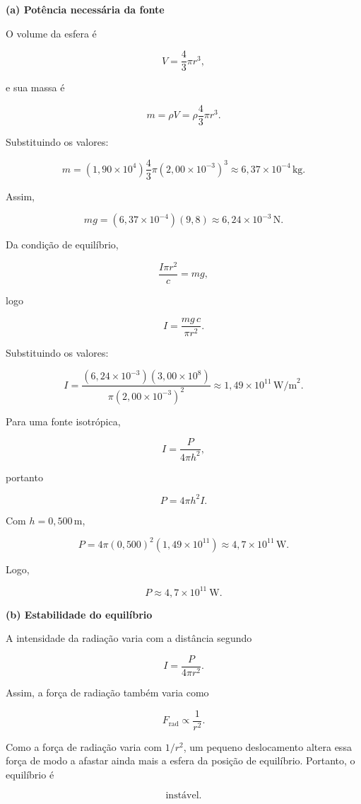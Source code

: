 \textbf{(a) Potência necessária da fonte}

O volume da esfera é

\[
V=\frac{4}{3}\pi r^3,
\]

e sua massa é

\[
m=\rho V
  =\rho\frac{4}{3}\pi r^3.
\]

Substituindo os valores:

\[
m
=(1,90\times10^{4})
\frac{4}{3}\pi(2,00\times10^{-3})^3
\approx 6,37\times10^{-4}\,\text{kg}.
\]

Assim,

\[
mg
=(6,37\times10^{-4})(9,8)
\approx 6,24\times10^{-3}\,\text{N}.
\]

Da condição de equilíbrio,

\[
\frac{I\pi r^2}{c}=mg,
\]

logo

\[
I=\frac{mg\,c}{\pi r^2}.
\]

Substituindo os valores:

\[
I=
\frac{(6,24\times10^{-3})(3,00\times10^{8})}
{\pi(2,00\times10^{-3})^2}
\approx 1,49\times10^{11}\,\text{W/m}^2.
\]

Para uma fonte isotrópica,

\[
I=\frac{P}{4\pi h^2},
\]

portanto

\[
P=4\pi h^2 I.
\]

Com \(h=0,500\,\text{m}\),

\[
P
=4\pi(0,500)^2(1,49\times10^{11})
\approx 4,7\times10^{11}\,\text{W}.
\]

Logo,

\[
\boxed{P \approx 4,7\times10^{11}\ \text{W}}.
\]

\bigskip

\textbf{(b) Estabilidade do equilíbrio}

A intensidade da radiação varia com a distância segundo

\[
I=\frac{P}{4\pi r^2}.
\]

Assim, a força de radiação também varia como

\[
F_{\text{rad}}\propto \frac{1}{r^2}.
\]

Como a força de radiação varia com \(1/r^2\), um pequeno deslocamento altera essa força de modo a afastar ainda mais a esfera da posição de equilíbrio. Portanto, o equilíbrio é

\[
\boxed{\text{instável}}.
\]

\vspace{1cm}
